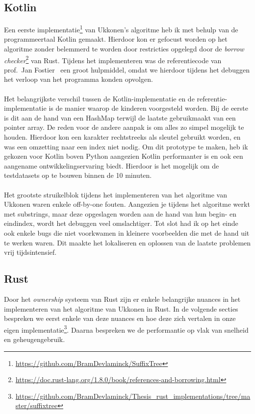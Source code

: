 \subsection{Kotlin}\label{subsec:kotlin}
Een eerste implementatie\footnote{\url{https://github.com/BramDevlaminck/SuffixTree}} van Ukkonen's algoritme heb ik met behulp van de programmeertaal Kotlin gemaakt.
Hierdoor kon er gefocust worden op het algoritme zonder belemmerd te worden door restricties opgelegd door de \textit{borrow checker}\footnote{\url{https://doc.rust-lang.org/1.8.0/book/references-and-borrowing.html}} van Rust.
Tijdens het implementeren was de referentiecode van prof.~Jan Fostier~\cite{Ukkonen_CCB} een groot hulpmiddel, omdat we hierdoor tijdens het debuggen het verloop van het programma konden opvolgen.
\\ \\
Het belangrijkste verschil tussen de Kotlin-implementatie en de referentie-implementatie is de manier waarop de kinderen voorgesteld worden.
Bij de eerste is dit aan de hand van een HashMap terwijl de laatste gebruikmaakt van een pointer array.
De reden voor de andere aanpak is om alles zo simpel mogelijk te houden.
Hierdoor kon een karakter rechtstreeks als sleutel gebruikt worden, en was een omzetting naar een index niet nodig.
Om dit prototype te maken, heb ik gekozen voor Kotlin boven Python aangezien Kotlin performanter is en ook een aangename ontwikkelingservaring biedt.
Hierdoor is het mogelijk om de testdatasets op te bouwen binnen de 10 minuten.
\\ \\
Het grootste struikelblok tijdens het implementeren van het algoritme van Ukkonen waren enkele off-by-one fouten.
Aangezien je tijdens het algoritme werkt met substrings, maar deze opgeslagen worden aan de hand van hun begin- en eindindex, wordt het debuggen veel omslachtiger.
Tot slot had ik op het einde ook enkele bugs die niet voorkwamen in kleinere voorbeelden die met de hand uit te werken waren.
Dit maakte het lokaliseren en oplossen van de laatste problemen vrij tijdsintensief.

\subsection{Rust}\label{subsec:rust}
Door het \textit{ownership} systeem van Rust zijn er enkele belangrijke nuances in het implementeren van het algoritme van Ukkonen in Rust.
In de volgende secties bespreken we eerst enkele van deze nuances en hoe deze zich vertalen in onze eigen implementatie\footnote{\url{https://github.com/BramDevlaminck/Thesis_rust_implementations/tree/master/suffixtree}}.
Daarna bespreken we de performantie op vlak van snelheid en geheugengebruik.

